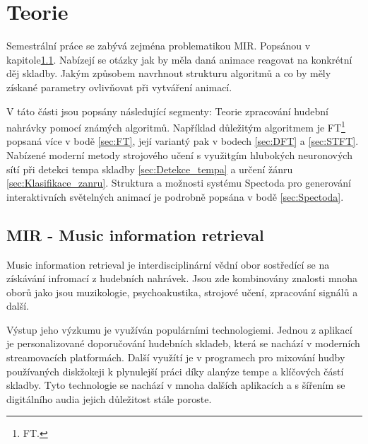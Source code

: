 \chapter{Teorie}

Semestrální práce se zabývá zejména problematikou \acs{MIR}. Popsánou v kapitole\ref{sec:MIR}.
Nabízejí se otázky jak by měla daná animace reagovat na konkrétní děj skladby.
Jakým způsobem navrhnout strukturu algoritmů a co by měly získané parametry ovlivňovat při vytváření animací.

V táto části jsou popsány následující segmenty: Teorie zpracování hudební nahrávky pomocí známých algoritmů. Například důležitým algoritmem je \acs{FT}\footnote{\acl{FT}.}
popsaná více v bodě \ref{sec:FT}, její variantý pak v bodech \ref{sec:DFT} a \ref{sec:STFT}.
Nabízené moderní metody strojového učení s využitgím hlubokých neuronových sítí při detekci tempa skladby \ref{sec:Detekce_tempa} a určení žánru \ref{sec:Klasifikace_zanru}.  
Struktura a možnosti systému Spectoda pro generování interaktivních světelných animací je podrobně popsána v bodě \ref{sec:Spectoda}.

\section{MIR - Music information retrieval} \label{sec:MIR}
    Music information retrieval je interdisciplinární vědní obor sostředící se na získávání infromací z hudebních nahrávek.
    Jsou zde kombinovány znalosti mnoha oborů jako jsou muzikologie, psychoakustika, strojové učení, zpracování signálů a další. 
    

    Výstup jeho výzkumu je využíván populárními technologiemi. 
    Jednou z aplikací je personalizované doporučování hudebních skladeb, která se nachází v moderních streamovacích platformách.
    Další využítí je v programech pro mixování hudby používaných diskžokeji k plynulejší práci díky alanýze tempe a klíčových částí skladby.
    Tyto technologie se nachází v mnoha dalších aplikacích a s šířením se digitálního audia jejich důležitost stále poroste.
    
